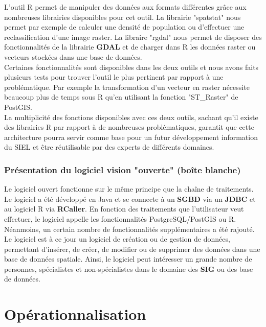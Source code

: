 L'outil R permet de manipuler des données aux formats différentes grâce aux nombreuses librairies disponibles pour cet outil. La librairie "spatstat" nous permet par exemple de calculer une densité de population ou d'effectuer une reclassification d'une image raster. La libraire "rgdal" nous permet de disposer des fonctionnalités de la librairie \textbf{GDAL} et de charger dans R les données raster ou vecteurs stockées dans une base de données.\\

Certaines fonctionnalités sont disponibles dans les deux outils et nous avons faits plusieurs tests pour trouver l'outil le plus pertinent par rapport à une problématique. Par exemple la transformation d'un vecteur en raster nécessite beaucoup plus de temps sous R qu'en utilisant la fonction "ST\_Raster" de PostGIS.\\

La multiplicité des fonctions disponibles avec ces deux outils, sachant qu'il existe des librairies R par rapport à de nombreuses problématiques, garantit que cette architecture pourra servir comme base pour un futur développement information du SIEL et être réutilisable par des experts de différents domaines.\\

\subsubsection{Présentation du logiciel vision "ouverte" (boîte blanche)}

Le logiciel ouvert fonctionne sur le même principe que la chaîne de traitements. Le logiciel a été développé en Java et se connecte à un \textbf{SGBD} via un \textbf{JDBC} et au logiciel R via \textbf{RCaller}. En fonction des traitements que l'utilisateur veut effectuer, le logiciel appelle les fonctionnalités PostgreSQL/PostGIS ou R.\\

Néanmoins, un certain nombre de fonctionnalités supplémentaires a été rajouté. Le logiciel est à ce jour un logiciel de création ou de gestion de données, permettant d'insérer, de créer, de modifier ou de supprimer des données dans une base de données spatiale. Ainsi, le logiciel peut intéresser un grande nombre de personnes, spécialistes et non-spécialistes dans le domaine des \textbf{SIG} ou des base de données.\\



\section{Opérationnalisation}

